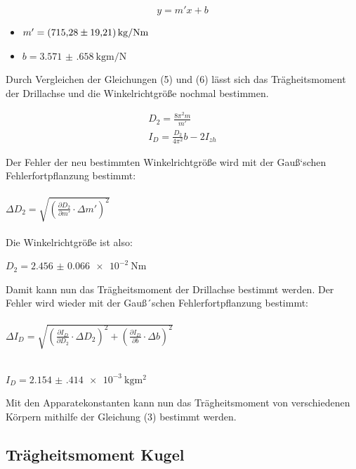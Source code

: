 \begin{equation}
  y = m'x + b
\end{equation}

\begin{itemize}
  \item $m' = \SI{715.28(1921)}{\kilo\gram\per{\N\meter}}$
  \item $b = \SI{3.571(658)}{\kilo\gram\meter\per\N}$
\end{itemize}

Durch Vergleichen der Gleichungen (5) und (6) lässt sich das Trägheitsmoment der
Drillachse und die Winkelrichtgröße nochmal bestimmen.

\begin{gather}
  D_2 = \frac{8\pi^2m}{m'} \\
  I_D = \frac{D_2}{4\pi^2}b - 2I_{zh}
\end{gather}

Der Fehler der neu bestimmten Winkelrichtgröße wird mit der Gauß`schen Fehlerfortpflanzung
bestimmt:\\\\

$\Delta D_2 = \sqrt{\left(\frac{\partial D_2}{\partial m'} \cdot \Delta m' \right)^2}$\\\\

Die Winkelrichtgröße ist also:

\centerline{$D_2 = \SI{2.456(66)e-2}{\N\meter}$}

Damit kann nun das Trägheitsmoment der Drillachse bestimmt werden. Der Fehler wird
wieder mit der Gauß´schen Fehlerfortpflanzung bestimmt:\\\\

$\Delta I_D = \sqrt{\left(\frac{\partial I_D}{\partial D_2} \cdot \Delta D_2 \right)^2 +
\left(\frac{\partial I_D}{\partial b} \cdot \Delta b \right)^2}$\\\\

\centerline{$I_D = \SI{2.154(414)e-3}{\kilo\gram\meter\squared}$}

Mit den Apparatekonstanten kann nun das Trägheitsmoment von verschiedenen Körpern
mithilfe der Gleichung (3) bestimmt werden.


\subsection{Trägheitsmoment Kugel}


